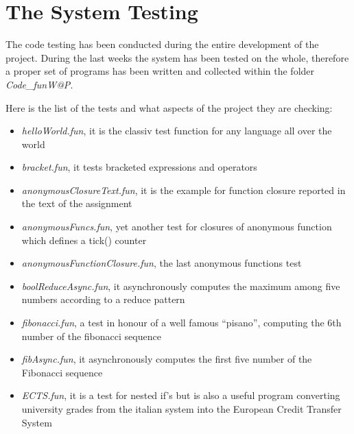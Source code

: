 \chapter{\label{chapter6} The System Testing}

The code testing has been conducted during the entire development of the project. During the last weeks the system has been tested on the whole, therefore a proper set of \fwap programs has been written and collected within the folder \textsl{Code_funW@P}. 

Here is the list of the tests and what aspects of the project they are checking:
\begin{itemize}
	\item \textit{helloWorld.fun}, it is the classiv test function for any language all over the world
	\item \textit{bracket.fun}, it tests bracketed expressions and operators
	\item \textit{anonymousClosureText.fun}, it is the example for function closure reported in the text of the assignment \cite{exercise}
	\item \textit{anonymousFuncs.fun}, yet another test for closures of anonymous function which defines a tick() counter
	\item \textit{anonymousFunctionClosure.fun}, the last anonymous functions test
	\item \textit{boolReduceAsync.fun}, it asynchronously computes the maximum among five numbers according to a reduce pattern
	\item \textit{fibonacci.fun}, a test in honour of a well famous "`pisano"', computing the 6th number of the fibonacci sequence
	\item \textit{fibAsync.fun}, it asynchronously computes the first five number of the Fibonacci sequence
	
	\item \textit{ECTS.fun}, it is a test for nested if's but is also a useful program converting university grades from the italian system into the European Credit Transfer System \cite{ects}
\end{itemize}
